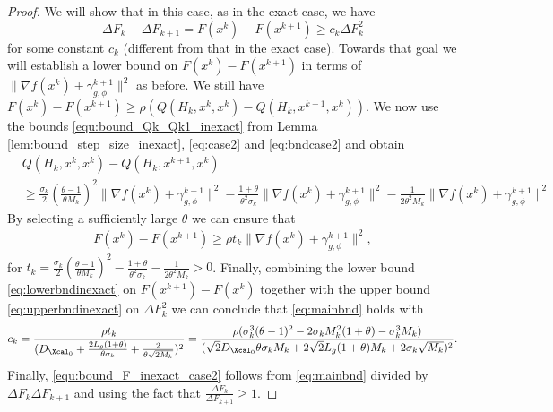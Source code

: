 \documentclass[11pt]{article}
\numberwithin{equation}{section}
\begin{document}
\begin{proof}
	We will  show that in this case, as in the exact case,  we have 
	\begin{equation}\label{eq:mainbnd}
		\Delta F_k - \Delta F_{k+1} = 
		 F(x^k) - F(x^{k+1})\geq c_k \Delta F_k^2
	\end{equation} for some constant $c_k$ (different from that in the exact case).  
	Towards that goal  we will establish a lower bound on $F(x^{k})-F(x^{k+1})$ in terms of $\|\nabla f(x^k)+\gamma_{g, \phi}^{k+1}\|^2$ as before.
	We still have $F(x^{k})-F(x^{k+1})\geq \rho (Q(H_k, x^{k}, x^k)-Q(H_k,x^{k+1}, x^k))$. 
	We now use the bounds \eqref{equ:bound_Qk_Qk1_inexact} from Lemma  \ref{lem:bound_step_size_inexact}, \eqref{eq:case2} and \eqref{eq:bndcase2} and obtain
	\begin{align*}
		&Q(H_k,x^k,x^k) - Q(H_k,x^{k+1}, x^k) \\
		&\geq \frac{\sigma_k}{2}(\frac{\theta-1}{\theta M_k})^2 \| \nabla f(x^k) + \gamma_{g, \phi}^{k+1} \|^2
		- \frac{1+\theta}{\theta^2\sigma_k}\| \nabla f(x^k) + \gamma_{g, \phi}^{k+1} \|^2 
		- \frac{1}{2\theta^2M_k}\| \nabla f(x^k) + \gamma_{g, \phi}^{k+1} \|^2
	\end{align*}
	By selecting a sufficiently large $\theta$  we can ensure that 
	\begin{align}
	\label{eq:lowerbndinexact}
	    F(x^k) - F(x^{k+1})\geq \rho t_k \| \nabla f(x^k) + \gamma_{g, \phi}^{k+1} \|^2,
	\end{align}
	for $t_k=\frac{\sigma_k}{2}(\frac{\theta-1}{\theta M_k})^2 - \frac{1+\theta}{\theta^2\sigma_k}- \frac{1}{2\theta^2M_k}>0$. 
	Finally, combining the lower bound \eqref{eq:lowerbndinexact} on $F(x^{k+1})-F(x^k)$ together with the upper bound \eqref{eq:upperbndinexact}
	on $\Delta F_k^2$  we can conclude that \eqref{eq:mainbnd} holds with 
	\begin{align*}
		c_k= \frac{\rho t_k}{(D_{\Xcal_0} + \frac{2L_g(1+\theta)}{\theta\sigma_k} + \frac{2}{\theta\sqrt{2M_k}})^2} = \frac{\rho(\sigma_k^3(\theta-1)^2 - 2\sigma_kM_k^2(1+\theta) - \sigma_k^3M_k )}{(\sqrt{2}D_{\Xcal_0}\theta\sigma_kM_k + 2\sqrt{2}L_g(1+\theta)M_k + 2\sigma_k\sqrt{M_k} )^2}.    
	\end{align*}
	Finally, \eqref{equ:bound_F_inexact_case2} follows from \eqref{eq:mainbnd} divided by $\Delta F_k\Delta F_{k+1}$ and using the fact that $\frac{\Delta F_k}{\Delta F_{k+1}} \geq 1$.
	
\end{proof}
\end{document}
